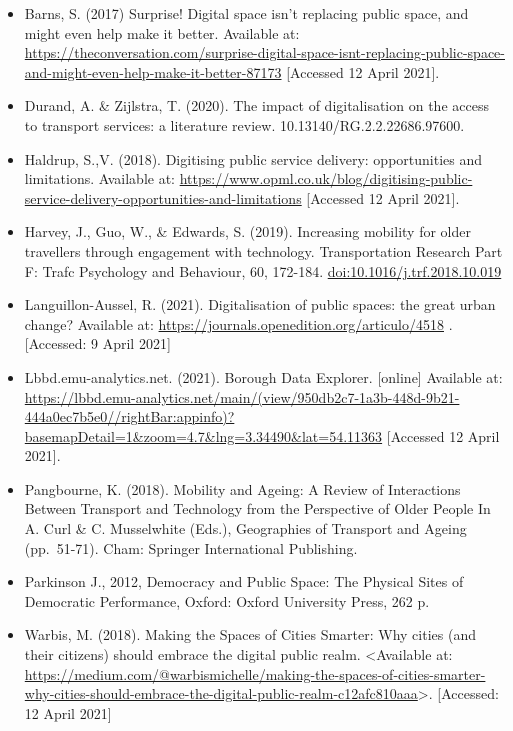 \documentclass[
]{book}
\providecommand{\tightlist}{%
  \setlength{\itemsep}{0pt}\setlength{\parskip}{0pt}}
\begin{document}
\begin{itemize}
\tightlist
\item
  Barns, S. (2017) Surprise! Digital space isn't replacing public space, and might even help make it better. Available at: \url{https://theconversation.com/surprise-digital-space-isnt-replacing-public-space-and-might-even-help-make-it-better-87173} {[}Accessed 12 April 2021{]}.
\item
  Durand, A. \& Zijlstra, T. (2020). The impact of digitalisation on the access to transport services: a literature review. 10.13140/RG.2.2.22686.97600.
\item
  Haldrup, S.,V. (2018). Digitising public service delivery: opportunities and limitations. Available at: \url{https://www.opml.co.uk/blog/digitising-public-service-delivery-opportunities-and-limitations} {[}Accessed 12 April 2021{]}.
\item
  Harvey, J., Guo, W., \& Edwards, S. (2019). Increasing mobility for older travellers through engagement with technology. Transportation Research Part F: Trafc Psychology and Behaviour, 60, 172-184. \url{doi:10.1016/j.trf.2018.10.019}
\item
  Languillon-Aussel, R. (2021). Digitalisation of public spaces: the great urban change? Available at: \url{https://journals.openedition.org/articulo/4518} . {[}Accessed: 9 April 2021{]}
\item
  Lbbd.emu-analytics.net. (2021). Borough Data Explorer. {[}online{]} Available at: \url{https://lbbd.emu-analytics.net/main/(view/950db2c7-1a3b-448d-9b21-444a0ec7b5e0//rightBar:appinfo)?basemapDetail=1\&zoom=4.7\&lng=3.34490\&lat=54.11363} {[}Accessed 12 April 2021{]}.
\item
  Pangbourne, K. (2018). Mobility and Ageing: A Review of Interactions Between Transport and Technology from the Perspective of Older People In A. Curl \& C. Musselwhite (Eds.), Geographies of Transport and Ageing (pp.~51-71). Cham: Springer International Publishing.
\item
  Parkinson J., 2012, Democracy and Public Space: The Physical Sites of Democratic Performance, Oxford: Oxford University Press, 262 p.
\item
  Warbis, M. (2018). Making the Spaces of Cities Smarter: Why cities (and their citizens) should embrace the digital public realm. \textless Available at: \url{https://medium.com/@warbismichelle/making-the-spaces-of-cities-smarter-why-cities-should-embrace-the-digital-public-realm-c12afc810aaa}\textgreater. {[}Accessed: 12 April 2021{]}
\end{itemize}
\end{document}
